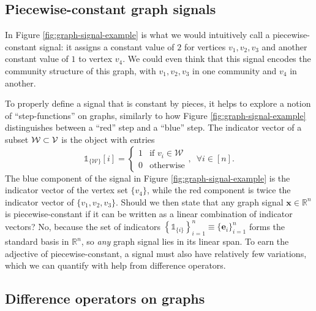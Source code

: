\subsection{Piecewise-constant graph signals}\label{sec:piece_const_graph_signals}

In Figure \ref{fig:graph-signal-example} is what we would intuitively call a piecewise-constant signal: it assigns a constant value of $2$ for vertices $v_1, v_2, v_3$ and another constant value of $1$ to vertex $v_4$. We could even think that this signal encodes the community structure of this graph, with $v_1, v_2, v_3$ in one community and $v_4$ in another.

To properly define a signal that is constant by pieces, it helps to explore a notion of ``step-functions'' on graphs, similarly to how Figure \ref{fig:graph-signal-example} distinguishes between a ``red'' step and a ``blue'' step. The indicator vector of a subset $\mathcal{W} \subset \mathcal{V}$ is the object with entries
\begin{equation}
    \mathbb{1}_{\{ \mathcal{W} \}}[i] = \left \{
        \begin{matrix}
            1 & \text{if } v_i \in \mathcal{W} \\
            0 & \text{otherwise}
        \end{matrix}
    \right.
    , \enspace \forall i \in [n].
\end{equation}
The blue component of the signal in Figure \ref{fig:graph-signal-example} is the indicator vector of the vertex set $\{v_4\}$, while the red component is twice the indicator vector of $\{v_1, v_2, v_3\}$. Should we then state that any graph signal $\mathbf{x} \in \mathbb{R}^{n}$ is piecewise-constant if it can be written as a linear combination of indicator vectors? No, because the set of indicators $\left\{ \mathbb{1}_{\{ i \}} \right\}_{i=1}^n \equiv \{\mathbf{e}_i\}_{i=1}^n$ forms the standard basis in $\mathbb{R}^{n}$, so \emph{any} graph signal lies in its linear span. To earn the adjective of piecewise-constant, a signal must also have relatively few variations, which we can quantify with help from difference operators.


\subsection{Difference operators on graphs}\label{sec:diff_op_graphs}

